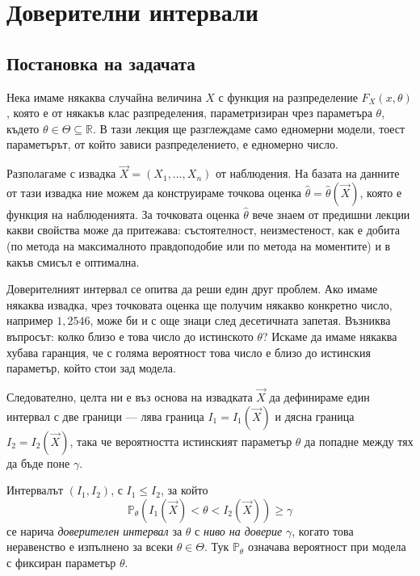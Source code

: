 \section{Доверителни интервали}

\subsection{Постановка на задачата}
Нека имаме някаква случайна величина $X$ с функция на разпределение $F_X(x, \theta)$, която е от някакъв клас разпределения, параметризиран чрез параметъра $\theta$, където $\theta \in \Theta \subseteq \mathbb{R}$. В тази лекция ще разглеждаме само едномерни модели, тоест параметърът, от който зависи разпределението, е едномерно число.

Разполагаме с извадка $\vec{X} = (X_1, \dots, X_n)$ от наблюдения. На базата на данните от тази извадка ние можем да конструираме точкова оценка $\hat{\theta} = \hat{\theta}(\vec{X})$, която е функция на наблюденията. За точковата оценка $\hat{\theta}$ вече знаем от предишни лекции какви свойства може да притежава: състоятелност, неизместеност, как е добита (по метода на максималното правдоподобие или по метода на моментите) и в какъв смисъл е оптимална.

Доверителният интервал се опитва да реши един друг проблем. Ако имаме някаква извадка, чрез точковата оценка ще получим някакво конкретно число, например $1{,}2546$, може би и с още знаци след десетичната запетая. Възниква въпросът: колко близо е това число до истинското $\theta$? Искаме да имаме някаква хубава гаранция, че с голяма вероятност това число е близо до истинския параметър, който стои зад модела.

Следователно, целта ни е въз основа на извадката $\vec{X}$ да дефинираме един интервал с две граници — лява граница $I_1 = I_1(\vec{X})$ и дясна граница $I_2 = I_2(\vec{X})$, така че вероятността истинският параметър $\theta$ да попадне между тях да бъде поне $\gamma$.

\begin{keydefn}\label{def:ci}
Интервалът $(I_1, I_2)$, с $I_1 \le I_2$, за който
\[
\mathbb{P}_{\theta}\!\left(I_1(\vec X) < \theta < I_2(\vec X)\right) \ge \gamma
\]
се нарича \emph{доверителен интервал} за $\theta$ с \emph{ниво на доверие} $\gamma$, когато това неравенство е изпълнено за всеки $\theta \in \Theta$. Тук $\mathbb{P}_{\theta}$ означава вероятност при модела с фиксиран параметър $\theta$.
\end{keydefn}

